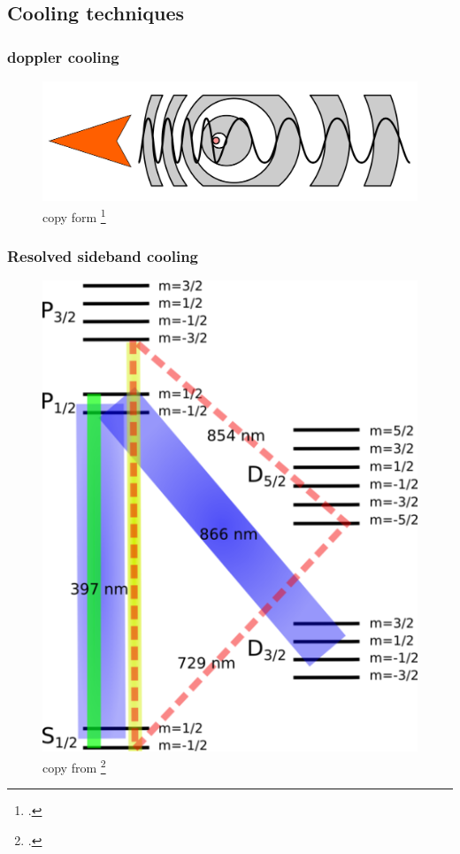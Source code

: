 \documentclass[18 pt]{beamer}
\begin{document}
\subsection{Cooling techniques}
\begin{frame}
  \frametitle{doppler cooling}
  \begin{figure}
    \includegraphics[width=.8\textwidth]{1920px-Doppler_effect_diagrammatic.svg.png}
    \caption{copy form \footcite{https://en.wikipedia.org/wiki/Doppler_cooling}}
  \end{figure}
\end{frame}
\begin{frame}
  \frametitle{Resolved sideband cooling}
  \begin{figure}
    \includegraphics{440px-Internal_structure_of_Ca_40_ion_with_zeeman_splitting.png}
    \caption{copy from \footcite{https://en.wikipedia.org/wiki/Resolved_sideband_cooling}}
  \end{figure}
\end{frame}
\end{document}

